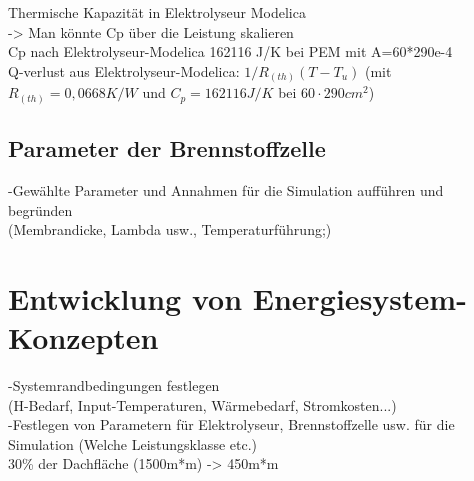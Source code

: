 Thermische Kapazität in Elektrolyseur Modelica\\
-> Man könnte Cp über die Leistung skalieren\\ 
Cp nach Elektrolyseur-Modelica 162116 J/K bei PEM mit A=60*290e-4\\

Q-verlust aus Elektrolyseur-Modelica: $1/R_(th)(T-T_u)$ (mit $R_(th) = 0,0668 K/W$ und $C_p = 162116 J/K$ bei $60 \cdot 290 cm^2$)\\


\subsection{Parameter der Brennstoffzelle}
-Gewählte Parameter und Annahmen für die Simulation aufführen und begründen\\
(Membrandicke, Lambda usw., Temperaturführung;)\\

\section{Entwicklung von Energiesystem-Konzepten}
-Systemrandbedingungen festlegen\\
(H-Bedarf, Input-Temperaturen, Wärmebedarf, Stromkosten...)\\
-Festlegen von Parametern für Elektrolyseur, Brennstoffzelle usw. für die Simulation (Welche Leistungsklasse etc.)\\
30\% der Dachfläche (1500m*m) -> 450m*m\\

